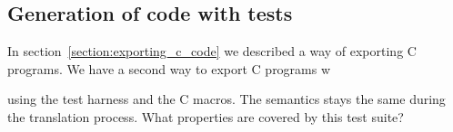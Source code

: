 \subsection{Generation of code with tests}
In section~\ref{section:exporting_c_code} we described a way of exporting C programs.
We have a second way to export C programs w

using the test harness and the C macros.
The semantics stays the same during the translation process.
What properties are covered by this test suite?



\begin{comment}


    definition emit_globals_tests :: "vname list ⇒ state ⇀ (nat set × test_instr list)" where
    "emit_globals_tests ≡ λvnames (σ,γ,μ). 
      fold_option (λx (D,emit). do {
        case γ x of
          Some vo ⇒ do {
            let cai = x;
            case vo of
                None ⇒ Some (D,emit)
              | Some (I v) ⇒ Some (D,emit @ [Assert_Eq cai v])
              | Some (NullVal) ⇒ Some (D,emit @ [Assert_Eq_Null cai] )
              | Some (A addr) ⇒ do {
                  (D,emit')←dfs μ D addr cai;
                  Some (D,emit@emit')
                }
          }
        | _ ⇒ Some (D,emit)
      }
      ) vnames ({},[])"



  definition tests_variables :: "test_instr list ⇒ nat ⇒ shows" where
    "tests_variables l ind ≡ foldr (λ                   
      (Discover _ i) ⇒ indent_basic ind (shows dflt_type o shows '' *'' o shows (base_var_name i))
      | _ ⇒ id
      ) l"

  definition tests_instructions :: "test_instr list ⇒ nat ⇒ shows" where
    "tests_instructions l ind ≡ foldr (λ                   
        (Discover ca i) ⇒ indent_basic ind (shows ''__TEST_HARNESS_DISCOVER '' o shows_paren ( shows ca o shows '', '' o shows (base_var_name i)))
      | (Assert_Eq ca v) ⇒ indent_basic ind (shows ''__TEST_HARNESS_ASSERT_EQ '' o shows_paren ( shows ca o shows '', '' o shows v))
      | (Assert_Eq_Null ca) ⇒ indent_basic ind (shows ''__TEST_HARNESS_ASSERT_EQ_NULL '' o shows_paren ( shows ca ))
      | (Assert_Eq_Ptr ca i) ⇒ indent_basic ind (shows ''__TEST_HARNESS_ASSERT_EQ_PTR '' o shows_paren ( shows ca o shows '', '' o shows (base_var_name i)))
      ) l"

  definition init_discovered_shows :: "nat ⇒ shows" where
    "init_discovered_shows ind ≡ indent_basic ind (shows ''__test_harness_discovered = hashset_create()'')"



\end{comment}
